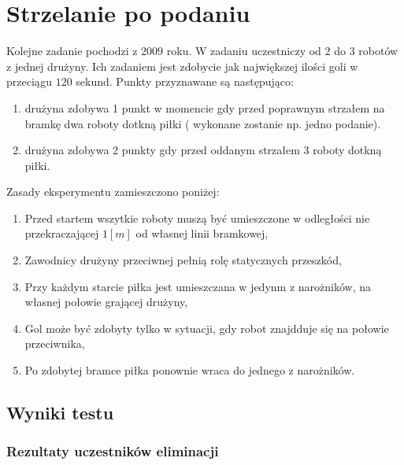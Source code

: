 \section{ Strzelanie po podaniu }
Kolejne zadanie pochodzi z $2009$ roku. W zadaniu uczestniczy od $2$ do $3$ robotów z jednej drużyny. Ich zadaniem jest zdobycie jak największej ilości goli w przeciągu
$120$ sekund. Punkty przyznawane są następująco:
\begin{enumerate}
    \item  drużyna zdobywa 1 punkt w momencie gdy przed poprawnym strzałem na bramkę dwa roboty dotkną piłki ( wykonane zostanie np. jedno podanie).
    \item  drużyna zdobywa 2 punkty gdy przed oddanym strzałem $3$ roboty dotkną piłki.
\end{enumerate}

Zasady eksperymentu zamieszczono poniżej:
\begin{enumerate}
    \item  Przed startem wszytkie roboty muszą być umieszczone w odległości nie przekraczającej $1[m]$ od własnej linii bramkowej, 
    \item  Zawodnicy drużyny przeciwnej pełnią rolę statycznych przeszkód,
    \item  Przy każdym starcie piłka jest umieszczana w jedynm z narożników, na własnej połowie grającej drużyny,
    \item  Gol może być zdobyty tylko w sytuacji, gdy robot znajdduje się na połowie przeciwnika,
    \item  Po zdobytej bramce piłka ponownie wraca do jednego z narożników.
\end{enumerate}

\subsection{ Wyniki testu }
\subsubsection{Rezultaty uczestników eliminacji}